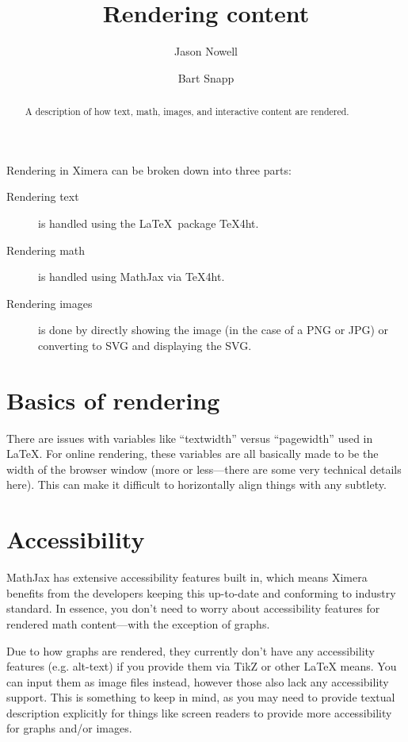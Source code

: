 \documentclass{ximera}
\title{Rendering content}
\author{Jason Nowell \and Bart Snapp}
\begin{document}
\begin{abstract}
    A description of how text, math, images, and interactive content are
    rendered.
\end{abstract}
\maketitle

Rendering in Ximera can be broken down into three parts:
\begin{description}
    \item[Rendering text] is handled using the \LaTeX\ package TeX4ht.
    \item[Rendering math] is handled using MathJax via TeX4ht.
    \item[Rendering images] is done by directly showing the image (in the case
        of a PNG or JPG) or converting to SVG and displaying the SVG.
\end{description}

\section{Basics of rendering}

There are issues with variables like ``textwidth'' versus
``pagewidth'' used in \LaTeX. For online rendering, these variables are all
basically made to be the width of the browser window (more or less---there are
some very technical details here). This can make it difficult to horizontally
align things with any subtlety.






\section{Accessibility}
MathJax has extensive accessibility features built in, which means
Ximera benefits from the developers keeping this up-to-date and conforming to
industry standard. In essence, you don't need to worry about accessibility
features for rendered math content---with the exception of graphs.

Due to how graphs are rendered, they currently don't have any
accessibility features (e.g. alt-text) if you provide them via TikZ or other
LaTeX means. You can input them as image files instead, however those also lack
any accessibility support. This is something to keep in mind, as you may need
to provide textual description explicitly for things like screen readers to
provide more accessibility for graphs and/or images.
\end{document}
